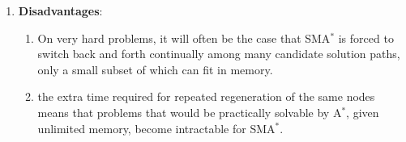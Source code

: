 \begin{enumerate}
    \item \textbf{Disadvantages}:
    \begin{enumerate}
        \item On very hard problems, it will often be the case that SMA$^\ast$ is forced to switch back and forth continually among many candidate solution paths, only a small subset of which can fit in memory.
        \hfill \cite{ai/book/Artificial-Intelligence-A-Modern-Approach/Russell-Norvig}

        \item the extra time required for repeated regeneration of the same nodes means that problems that would be practically solvable by A$^\ast$, given unlimited memory, become intractable for SMA$^\ast$.
        \hfill \cite{ai/book/Artificial-Intelligence-A-Modern-Approach/Russell-Norvig}
    \end{enumerate}
\end{enumerate}







